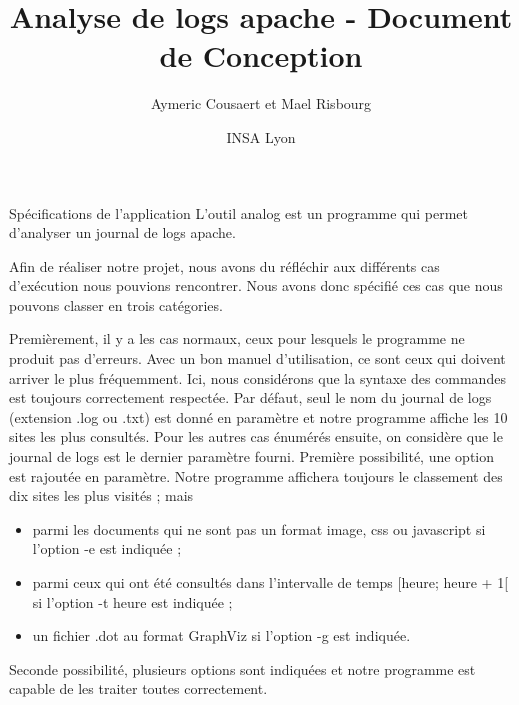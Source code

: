 \documentclass[11pt]{article}
\date{INSA Lyon}
\title{Analyse de logs apache - Document de Conception}
\author{Aymeric Cousaert et Mael Risbourg}
\begin{document}
\maketitle

\vspace{1cm}
\tableofcontents
\vspace{3cm}

\begin{section}{Spécifications de l'application}
L'outil analog est un programme qui permet d'analyser un journal de logs apache.

Afin de réaliser notre projet, nous avons du réfléchir aux différents cas d'exécution nous pouvions rencontrer. Nous avons donc spécifié ces cas que nous pouvons classer en trois catégories.
 \newline
 
Premièrement, il y a les cas normaux, ceux pour lesquels le programme ne produit pas d'erreurs. Avec un bon manuel d'utilisation, ce sont ceux qui doivent arriver le plus fréquemment. Ici, nous considérons que la syntaxe des commandes est toujours correctement respectée. Par défaut, seul le nom du journal de logs (extension .log ou .txt) est donné en paramètre et notre programme affiche les 10 sites les plus consultés. Pour les autres cas énumérés ensuite, on considère que le journal de logs est le dernier paramètre fourni. 
Première possibilité, une option est rajoutée en paramètre. Notre programme affichera toujours le classement des dix sites les plus visités ; mais 
\begin{itemize}
\item parmi les documents qui ne sont pas un format image, css ou javascript si l'option -e est indiquée ;
\item parmi ceux qui ont été consultés dans l'intervalle de temps [heure;  heure  + 1[ si l'option -t heure est indiquée ;
\item un fichier .dot au format GraphViz si l'option -g est indiquée.
\end{itemize} 
Seconde possibilité, plusieurs options sont indiquées et notre programme est capable de les traiter toutes correctement.
 \newline
 

\end{section}
\end{document}
